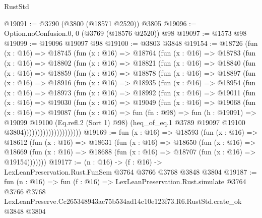 \begin{lexlean}{RustStd}
\begin{coremodule}
@19091 := @3790 (@3800 (@18571 @2520)) @3805
@19096 := Option.noConfusion.{0, 0} (@3769 (@18576 @2520)) @98
@19097 := @1573 @98
@19099 := @19096 @19097 @98
@19100 := @3803 @3848
@19154 := @18726
    (fun (x : @16) =>
    @18745
      (fun (x : @16) =>
      @18764
        (fun (x : @16) =>
        @18783
          (fun (x : @16) =>
          @18802
            (fun (x : @16) =>
            @18821
              (fun (x : @16) =>
              @18840
                (fun (x : @16) =>
                @18859
                  (fun (x : @16) =>
                  @18878
                    (fun (x : @16) =>
                    @18897
                      (fun (x : @16) =>
                      @18916
                        (fun (x : @16) =>
                        @18935
                          (fun (x : @16) =>
                          @18954
                            (fun (x : @16) =>
                            @18973
                              (fun (x : @16) =>
                              @18992
                                (fun (x : @16) =>
                                @19011
                                  (fun (x : @16) =>
                                  @19030
                                    (fun (x : @16) =>
                                    @19049
                                      (fun (x : @16) =>
                                      @19068
                                        (fun (x : @16) =>
                                        @19087
                                          (fun (x : @16) =>
                                          fun (fn : @98) =>
                                          fun (h : @19091) =>
                                          @19099
                                            @19100
                                            (Eq.refl.{2} (Sort 1) @98)
                                            (heq_of_eq.{1}
                                              @3789
                                              @19097
                                              @19100
                                              @3804)))))))))))))))))))))
@19169 := fun (x : @16) =>
  @18593
    (fun (x : @16) =>
    @18612
      (fun (x : @16) =>
      @18631
        (fun (x : @16) =>
        @18650
          (fun (x : @16) =>
          @18669 (fun (x : @16) => @18688 (fun (x : @16) => @18707 (fun (x : @16) => @19154)))))))
@19177 := (n : @16) -> (f : @16) -> LexLeanPreservation.Rust.FunSem @3764 @3766 @3768 @3848 @3804
@19187 := fun (n : @16) =>
  fun (f : @16) =>
  LexLeanPreservation.Rust.simulate
    @3764
    @3766
    @3768
    LexLeanPreserve.Cc265348943ac75b534ad14c10e123f73.R6.RustStd.crate_ok
    @3848
    @3804
\end{coremodule}
\end{lexlean}
